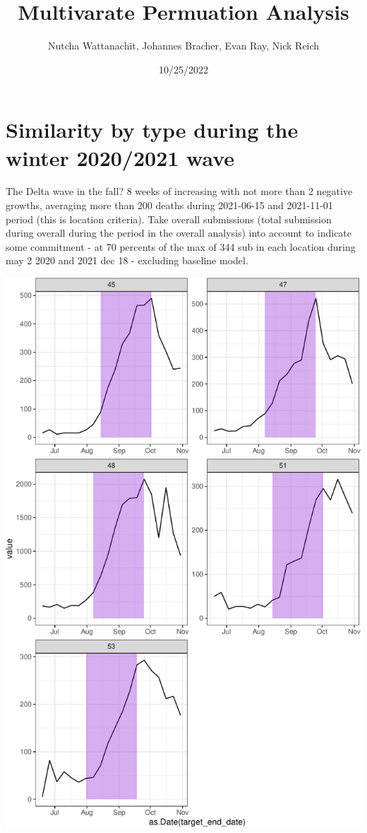 \documentclass[
]{article}
\title{Multivarate Permuation Analysis}
\author{Nutcha Wattanachit, Johannes Bracher, Evan Ray, Nick Reich}
\date{10/25/2022}
\begin{document}
\maketitle

\hypertarget{similarity-by-type-during-the-winter-20202021-wave}{%
\section{Similarity by type during the winter 2020/2021
wave}\label{similarity-by-type-during-the-winter-20202021-wave}}

The Delta wave in the fall? 8 weeks of increasing with not more than 2
negative growths, averaging more than 200 deaths during 2021-06-15 and
2021-11-01 period (this is location criteria). Take overall submissions
(total submission during overall during the period in the overall
analysis) into account to indicate some commitment - at 70 percents of
the max of 344 sub in each location during may 2 2020 and 2021 dec 18 -
excluding baseline model.

\includegraphics{multi_perm_analysis_files/figure-latex/p1-1.pdf}
\end{document}
